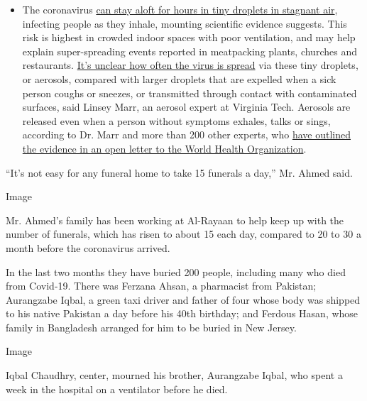 \begin{itemize}
  \begin{itemize}
  \tightlist
  \item
    The coronavirus
    \href{https://www.nytimes.com/2020/07/04/health/239-experts-with-one-big-claim-the-coronavirus-is-airborne.html?action=click\&pgtype=Article\&state=default\&region=MAIN_CONTENT_3\&context=storylines_faq}{can
    stay aloft for hours in tiny droplets in stagnant air}, infecting
    people as they inhale, mounting scientific evidence suggests. This
    risk is highest in crowded indoor spaces with poor ventilation, and
    may help explain super-spreading events reported in meatpacking
    plants, churches and restaurants.
    \href{https://www.nytimes.com/2020/07/06/health/coronavirus-airborne-aerosols.html?action=click\&pgtype=Article\&state=default\&region=MAIN_CONTENT_3\&context=storylines_faq}{It's
    unclear how often the virus is spread} via these tiny droplets, or
    aerosols, compared with larger droplets that are expelled when a
    sick person coughs or sneezes, or transmitted through contact with
    contaminated surfaces, said Linsey Marr, an aerosol expert at
    Virginia Tech. Aerosols are released even when a person without
    symptoms exhales, talks or sings, according to Dr. Marr and more
    than 200 other experts, who
    \href{https://academic.oup.com/cid/article/doi/10.1093/cid/ciaa939/5867798}{have
    outlined the evidence in an open letter to the World Health
    Organization}.
  \end{itemize}
\end{itemize}

``It's not easy for any funeral home to take 15 funerals a day,'' Mr.
Ahmed said.

Image

Mr. Ahmed's family has been working at Al-Rayaan to help keep up with
the number of funerals, which has risen to about 15 each day, compared
to 20 to 30 a month before the coronavirus arrived.

In the last two months they have buried 200 people, including many who
died from Covid-19. There was Ferzana Ahsan, a pharmacist from Pakistan;
Aurangzabe Iqbal, a green taxi driver and father of four whose body was
shipped to his native Pakistan a day before his 40th birthday; and
Ferdous Hasan, whose family in Bangladesh arranged for him to be buried
in New Jersey.

Image

Iqbal Chaudhry, center, mourned his brother, Aurangzabe Iqbal, who spent
a week in the hospital on a ventilator before he died.

